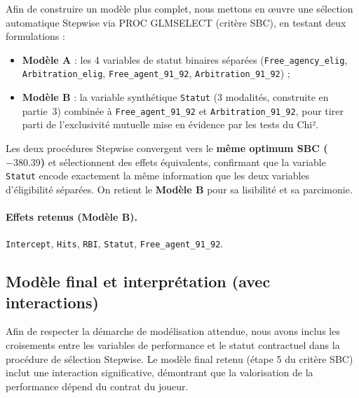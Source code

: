 \documentclass[11pt,a4paper]{article}
\begin{document}
Afin de construire un modèle plus complet, nous mettons en œuvre une sélection
automatique Stepwise via PROC GLMSELECT (critère SBC), en testant deux
formulations :
\begin{itemize}
  \item \textbf{Modèle A} : les 4 variables de statut binaires séparées
        (\texttt{Free\_agency\_elig}, \texttt{Arbitration\_elig},
        \texttt{Free\_agent\_91\_92}, \texttt{Arbitration\_91\_92}) ;\vspace{0.3cm}
  \item \textbf{Modèle B} : la variable synthétique \texttt{Statut}
        (3 modalités, construite en partie~3) combinée à
        \texttt{Free\_agent\_91\_92} et \texttt{Arbitration\_91\_92},
        pour tirer parti de l'exclusivité mutuelle mise en évidence par les
        tests du Chi².
\end{itemize}

Les deux procédures Stepwise convergent vers le \textbf{même optimum SBC ($-380.39$)} et sélectionnent des effets équivalents, confirmant que la variable \texttt{Statut} encode exactement la même information que les deux variables d'éligibilité séparées. On retient le \textbf{Modèle B} pour sa lisibilité et sa parcimonie.

\paragraph{Effets retenus (Modèle B).}
\texttt{Intercept}, \texttt{Hits}, \texttt{RBI}, \texttt{Statut},
\texttt{Free\_agent\_91\_92}.

\subsection{Modèle final et interprétation (avec interactions)}

Afin de respecter la démarche de modélisation attendue, nous avons inclus les croisements entre les variables de performance et le statut contractuel dans la procédure de sélection Stepwise. Le modèle final retenu (étape 5 du critère SBC) inclut une interaction significative, démontrant que la valorisation de la performance dépend du contrat du joueur.
\end{document}
